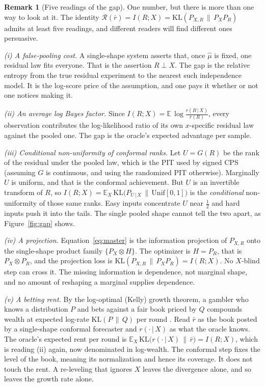 \documentclass[11pt]{article}
\theoremstyle{definition}
\newtheorem{remark}{Remark}
\newcommand{\E}{\mathbb{E}}
\newcommand{\KL}{\mathrm{KL}}
\newcommand{\given}{\,\vert\,}
\begin{document}
\begin{remark}[Five readings of the gap]\label{rem:readings}
One number, but there is more than one way to look at it. The identity
$\mathcal{R}(\bar r)=I(R;X)=\KL(P_{X,R}\,\|\,P_X P_R)$ admits at least five readings, and
different readers will find different ones persuasive.

\emph{(i) A false-pooling cost.} A single-shape system asserts that, once $\hat\mu$ is fixed,
one residual law fits everyone. That is the assertion $R\perp X$. The gap is the relative
entropy from the true residual experiment to the nearest such independence model. It is the
log-score price of the assumption, and one pays it whether or not one notices making it.

\emph{(ii) An average log Bayes factor.} Since
$I(R;X)=\E\,\log\frac{r(R\given X)}{\bar r(R)}$, every observation contributes the
log-likelihood ratio of its own $x$-specific residual law against the pooled one. The gap is
the oracle's expected advantage per sample.

\emph{(iii) Conditional non-uniformity of conformal ranks.} Let $U=G(R)$ be the rank of the
residual under the pooled law, which is the PIT used by signed CPS (assuming $G$ is
continuous, and using the randomized PIT otherwise). Marginally $U$ is uniform, and that is
the conformal achievement. But $U$ is an invertible transform of $R$, so
$I(R;X)=\E_X\,\KL\!\big(P_{U\given X}\,\|\,\mathrm{Unif}[0,1]\big)$ is the \emph{conditional}
non-uniformity of those same ranks. Easy inputs concentrate $U$ near $\tfrac12$ and hard
inputs push it into the tails. The single pooled shape cannot tell the two apart, as
Figure~\ref{fig:gap} shows.

\emph{(iv) A projection.} Equation~\eqref{eq:master} is the information projection of
$P_{X,R}$ onto the single-shape product family $\{P_X\otimes H\}$. The optimizer is $H=P_R$,
that is $P_X\otimes P_R$, and the projection loss is $\KL(P_{X,R}\,\|\,P_X P_R)=I(R;X)$. No
$X$-blind step can cross it. The missing information is dependence, not marginal shape, and
no amount of reshaping a marginal supplies dependence.

\emph{(v) A betting rent.} By the log-optimal (Kelly) growth theorem, a gambler who knows a
distribution $P$ and bets against a fair book priced by $Q$ compounds wealth at expected
log-rate $\KL(P\,\|\,Q)$ per round \citep{kelly1956new,cover2006elements}. Read $\bar r$ as
the book posted by a single-shape conformal forecaster and $r(\cdot\given X)$ as what the
oracle knows. The oracle's expected rent per round is
$\E_X\,\KL\big(r(\cdot\given X)\,\|\,\bar r\big)=I(R;X)$, which is reading (ii) again, now
denominated in log-wealth. The conformal step fixes the level of the book, meaning its
normalization and hence its coverage. It does not touch the rent. A re-leveling that ignores
$X$ leaves the divergence alone, and so leaves the growth rate alone.
\end{remark}
\end{document}
